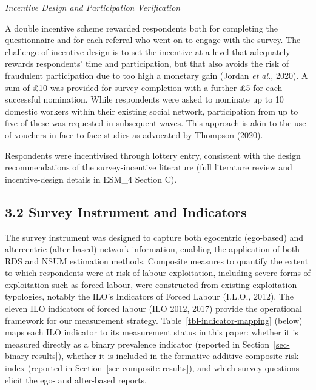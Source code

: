 \documentclass[
  12pt,
  letterpaper,
  DIV=11,
  numbers=noendperiod]{scrartcl}
\begin{document}
\emph{Incentive Design and Participation Verification}

A double incentive scheme rewarded respondents both for completing the
questionnaire and for each referral who went on to engage with the
survey. The challenge of incentive design is to set the incentive at a
level that adequately rewards respondents' time and participation, but
that also avoids the risk of fraudulent participation due to too high a
monetary gain (Jordan \emph{et al.}, 2020). A sum of £10 was provided
for survey completion with a further £5 for each successful nomination.
While respondents were asked to nominate up to 10 domestic workers
within their existing social network, participation from up to five of
these was requested in subsequent waves. This approach is akin to the
use of vouchers in face-to-face studies as advocated by Thompson (2020).

Respondents were incentivised through lottery entry, consistent with the
design recommendations of the survey-incentive literature (full
literature review and incentive-design details in ESM\_4 Section C).

\subsection{3.2 Survey Instrument and
Indicators}\label{sec-survey-instrument}

The survey instrument was designed to capture both egocentric
(ego-based) and altercentric (alter-based) network information, enabling
the application of both RDS and NSUM estimation methods. Composite
measures to quantify the extent to which respondents were at risk of
labour exploitation, including severe forms of exploitation such as
forced labour, were constructed from existing exploitation typologies,
notably the ILO's Indicators of Forced Labour (I.L.O., 2012). The eleven
ILO indicators of forced labour (ILO 2012, 2017) provide the operational
framework for our measurement strategy.
Table~\ref{tbl-indicator-mapping} (below) maps each ILO indicator to its
measurement status in this paper: whether it is measured directly as a
binary prevalence indicator (reported in
Section~\ref{sec-binary-results}), whether it is included in the
formative additive composite risk index (reported in
Section~\ref{sec-composite-results}), and which survey questions elicit
the ego- and alter-based reports.
\end{document}
